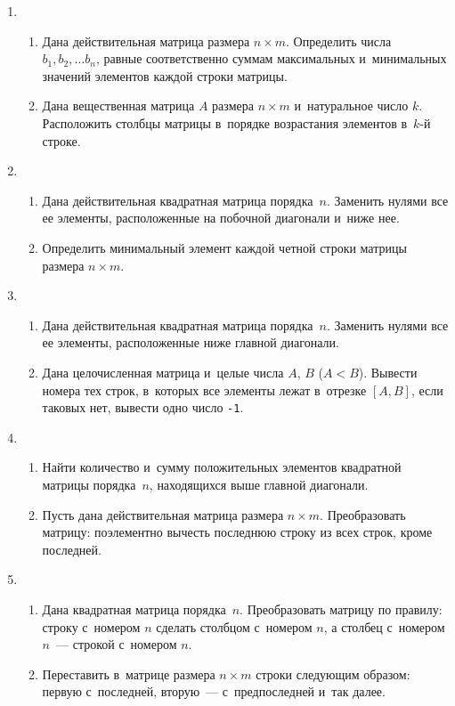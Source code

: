 \documentclass{article}
\newcommand{\textex}[1]{\texttt{\color{ForestGreen}#1}}
\begin{document}
\begin{enumerate}[label={}, leftmargin=0pt, itemindent=0pt]
\item
\begin{enumerate}[label=\arabic{enumi}.\arabic*.] %
  \item
  Дана действительная матрица размера $n\times m$. Определить числа $b_1, b_2, \ldots b_n$, равные соответственно суммам максимальных и~минимальных значений элементов каждой строки матрицы.
  \item
  Дана вещественная матрица $A$ размера $n\times m$ и~натуральное число $k$. Расположить столбцы матрицы в~порядке возрастания элементов в~$k$-й строке. 
\end{enumerate}

\item
\begin{enumerate}[label=\arabic{enumi}.\arabic*.] %
  \item
  Дана действительная квадратная матрица порядка~$n$. Заменить нулями все ее элементы, расположенные на побочной диагонали и~ниже нее.
  \item
  Определить минимальный элемент каждой четной строки матрицы размера $n\times m$.
\end{enumerate}

\item
\begin{enumerate}[label=\arabic{enumi}.\arabic*.] %
  \item
  Дана действительная квадратная матрица порядка~$n$. Заменить нулями все ее элементы, расположенные ниже главной диагонали.
  \item
  Дана целочисленная матрица и~целые числа $A$, $B$ ($A<B$). Вывести номера тех строк, в~которых все элементы лежат в~отрезке $[A, B]$, если таковых нет, вывести одно число \textex{-1}.
\end{enumerate}

\item
\begin{enumerate}[label=\arabic{enumi}.\arabic*.] %
  \item
  Найти количество и~сумму положительных элементов квадратной матрицы порядка~$n$, находящихся выше главной диагонали.
  \item
  Пусть дана действительная матрица размера $n\times m$. Преобразовать матрицу: поэлементно вычесть последнюю строку из всех строк, кроме последней.
\end{enumerate}

\item
\begin{enumerate}[label=\arabic{enumi}.\arabic*.] %
  \item
  Дана квадратная матрица порядка~$n$. Преобразовать матрицу по правилу: строку с~номером $n$ сделать столбцом с~номером $n$, а столбец с~номером $n$~— строкой с~номером $n$.
  \item
  Переставить в~матрице размера $n\times m$ строки следующим образом: первую с~последней, вторую~— с~предпоследней и~так далее.
\end{enumerate}


\end{enumerate}
\end{document}
